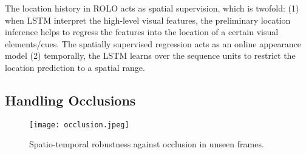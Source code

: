 \documentclass{article}
\begin{document}
The location history in ROLO acts as spatial supervision, which is twofold: (1) when LSTM interpret the high-level visual features, the preliminary location inference helps to regress the features into the location of a certain visual elements/cues. The spatially supervised regression acts as an online appearance model (2) temporally, the LSTM learns over the sequence units to restrict the location prediction to a spatial range.   

\subsection{Handling Occlusions}
\begin{figure}[h] %
	\centering
	\captionsetup{justification=centering}
	\texttt{[image: occlusion.jpeg]}
	\caption{Spatio-temporal robustness against occlusion in unseen frames.}
	\label{fig-occlusion}
\end{figure}
\end{document}
